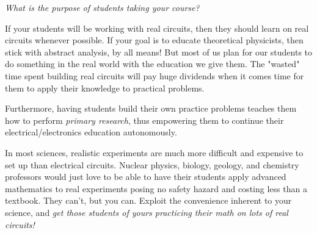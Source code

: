 \hskip 1in
{\it What is the purpose of students taking your course?}

\vskip 10pt

If your students will be working with real circuits, then they should learn on real circuits whenever possible.  If your goal is to educate theoretical physicists, then stick with abstract analysis, by all means!  But most of us plan for our students to do something in the real world with the education we give them.  The "wasted" time spent building real circuits will pay huge dividends when it comes time for them to apply their knowledge to practical problems.

Furthermore, having students build their own practice problems teaches them how to perform {\it primary research}, thus empowering them to continue their electrical/electronics education autonomously.

In most sciences, realistic experiments are much more difficult and expensive to set up than electrical circuits.  Nuclear physics, biology, geology, and chemistry professors would just love to be able to have their students apply advanced mathematics to real experiments posing no safety hazard and costing less than a textbook.  They can't, but you can.  Exploit the convenience inherent to your science, and {\it get those students of yours practicing their math on lots of real circuits!}



